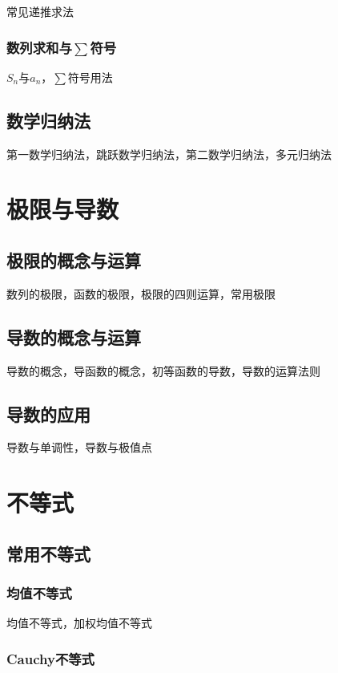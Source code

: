 \documentclass[lang=cn, zihao=4.5]{elegantbook}
\begin{document}
常见递推求法

\subsection{数列求和与$\sum$符号}

$S_n$与$a_n$，$\sum$符号用法

\section{数学归纳法}

第一数学归纳法，跳跃数学归纳法，第二数学归纳法，多元归纳法

\chapter{极限与导数}

\section{极限的概念与运算}

数列的极限，函数的极限，极限的四则运算，常用极限

\section{导数的概念与运算}

导数的概念，导函数的概念，初等函数的导数，导数的运算法则

\section{导数的应用}

导数与单调性，导数与极值点

\chapter{不等式}

\section{常用不等式}

\subsection{均值不等式}

均值不等式，加权均值不等式

\subsection{Cauchy不等式}
\end{document}
